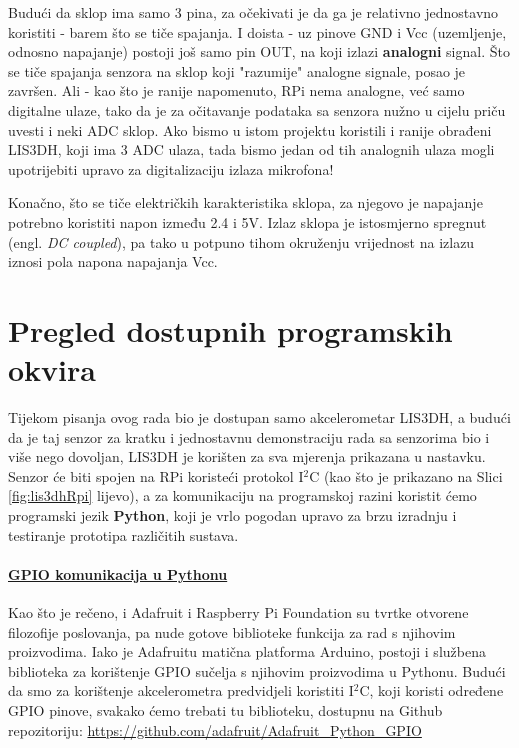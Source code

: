\documentclass[12pt,a4paper]{article}
\begin{document}
		\par Budući da sklop ima samo 3 pina, za očekivati je da ga je relativno jednostavno koristiti - barem što se tiče spajanja. I doista - uz pinove GND i Vcc (uzemljenje, odnosno napajanje) postoji još samo pin OUT, na koji izlazi \textbf{analogni} signal. Što se tiče spajanja senzora na sklop koji "razumije" analogne signale, posao je završen. Ali - kao što je ranije napomenuto, RPi nema analogne, već samo digitalne ulaze, tako da je za očitavanje podataka sa senzora nužno u cijelu priču uvesti i neki ADC sklop. Ako bismo u istom projektu koristili i ranije obrađeni LIS3DH, koji ima 3 ADC ulaza, tada bismo jedan od tih analognih ulaza mogli upotrijebiti upravo za digitalizaciju izlaza mikrofona!

		\par Konačno, što se tiče električkih karakteristika sklopa, za njegovo je napajanje potrebno koristiti napon između 2.4 i 5V. Izlaz sklopa je istosmjerno spregnut (engl. \textit{DC coupled}), pa tako u potpuno tihom okruženju vrijednost na izlazu iznosi pola napona napajanja Vcc.


\section{Pregled dostupnih programskih okvira}
Tijekom pisanja ovog rada bio je dostupan samo akcelerometar LIS3DH, a budući da je taj senzor za kratku i jednostavnu demonstraciju rada sa senzorima bio i više nego dovoljan, LIS3DH je korišten za sva mjerenja prikazana u nastavku. Senzor će biti spojen na RPi koristeći protokol I$^2$C (kao što je prikazano na Slici \ref{fig:lis3dhRpi} lijevo), a za komunikaciju na programskoj razini koristit ćemo programski jezik \textbf{Python}, koji je vrlo pogodan upravo za brzu izradnju i testiranje prototipa različitih sustava.

\paragraph{\underline{GPIO komunikacija u Pythonu}} %
	\label{par:gpio_py}
		Kao što je rečeno, i Adafruit i Raspberry Pi Foundation su tvrtke otvorene filozofije poslovanja, pa nude gotove biblioteke funkcija za rad s njihovim proizvodima. Iako je Adafruitu matična platforma Arduino, postoji i službena biblioteka za korištenje GPIO sučelja s njihovim proizvodima u Pythonu. Budući da smo za korištenje akcelerometra predvidjeli koristiti I$^2$C, koji koristi određene GPIO pinove, svakako ćemo trebati tu biblioteku, dostupnu na Github repozitoriju: \url{https://github.com/adafruit/Adafruit_Python_GPIO}
		
\end{document}
